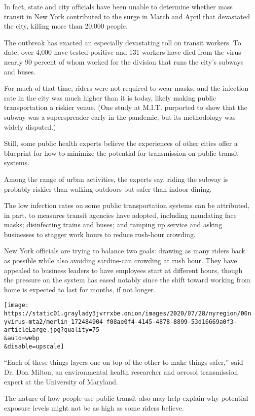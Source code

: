 In fact, state and city officials have been unable to determine whether
mass transit in New York contributed to the surge in March and April
that devastated the city, killing more than 20,000 people.

The outbreak has exacted an especially devastating toll on transit
workers. To date, over 4,000 have tested positive and 131 workers have
died from the virus --- nearly 90 percent of whom worked for the
division that runs the city's subways and buses.

For much of that time, riders were not required to wear masks, and the
infection rate in the city was much higher than it is today, likely
making public transportation a riskier venue. (One study at M.I.T.
purported to show that the subway was a superspreader early in the
pandemic, but its methodology was widely disputed.)

Still, some public health experts believe the experiences of other
cities offer a blueprint for how to minimize the potential for
transmission on public transit systems.

Among the range of urban activities, the experts say, riding the subway
is probably riskier than walking outdoors but safer than indoor dining.

The low infection rates on some public transportation systems can be
attributed, in part, to measures transit agencies have adopted,
including mandating face masks; disinfecting trains and buses; and
ramping up service and asking businesses to stagger work hours to reduce
rush-hour crowding.

New York officials are trying to balance two goals: drawing as many
riders back as possible while also avoiding sardine-can crowding at rush
hour. They have appealed to business leaders to have employees start at
different hours, though the pressure on the system has eased notably
since the shift toward working from home is expected to last for months,
if not longer.

\texttt{[image: https://static01.graylady3jvrrxbe.onion/images/2020/07/28/nyregion/00nyvirus-mta2/merlin\_172484904\_f08ae0f4-4145-4878-8899-53d16669a0f3-articleLarge.jpg?quality=75\\\&auto=webp\\\&disable=upscale]}

``Each of these things layers one on top of the other to make things
safer,'' said Dr. Don Milton, an environmental health researcher and
aerosol transmission expert at the University of Maryland.

The nature of how people use public transit also may help explain why
potential exposure levels might not be as high as some riders believe.

